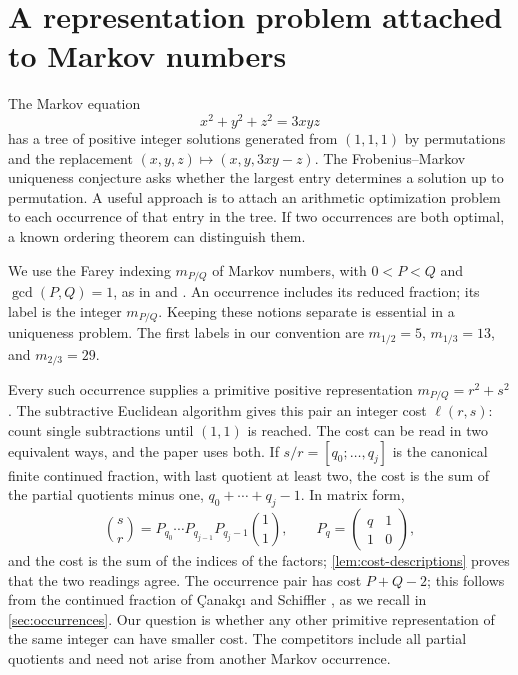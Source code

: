 \section{A representation problem attached to Markov numbers}

The Markov equation
$$
 x^2+y^2+z^2=3xyz
$$
has a tree of positive integer solutions generated from $(1,1,1)$ by permutations and
the replacement $(x,y,z)\mapsto(x,y,3xy-z)$. The Frobenius--Markov uniqueness
conjecture asks whether the largest entry determines a solution up to
permutation. A useful approach is to attach an arithmetic optimization
problem to each occurrence of that entry in the tree. If two occurrences
are both optimal, a known ordering theorem can distinguish them.

We use the Farey indexing $m_{P/Q}$ of Markov numbers, with
$0<P<Q$ and $\gcd(P,Q)=1$, as in \cite{Aigner2013} and
\cite{LagisquetEtAl2021}. An occurrence includes its reduced fraction;
its label is the integer $m_{P/Q}$. Keeping these notions separate is
essential in a uniqueness problem. The first labels in our convention
are $m_{1/2}=5$, $m_{1/3}=13$, and $m_{2/3}=29$.

Every such occurrence supplies a primitive positive representation
$m_{P/Q}=r^2+s^2$. The subtractive Euclidean algorithm gives this pair
an integer cost $\ell(r,s)$: count single subtractions until $(1,1)$ is
reached. The cost can be read in two equivalent ways, and the paper uses
both. If $s/r=[q_0;\ldots,q_j]$ is the canonical finite continued
fraction, with last quotient at least two, the cost is the sum of the
partial quotients minus one, $q_0+\cdots+q_j-1$. In matrix form,
$$
 \binom sr=P_{q_0}\cdots P_{q_{j-1}}P_{q_j-1}\binom11,\qquad
 P_q=\begin{pmatrix}q&1\\1&0\end{pmatrix},
$$
and the cost is the sum of the indices of the factors;
\cref{lem:cost-descriptions} proves that the two readings agree. The
occurrence pair has cost $P+Q-2$; this follows
from the continued fraction of \c{C}anak\c{c}{\i} and Schiffler
\cite{CanakciSchiffler2020}, as we recall in \cref{sec:occurrences}.
Our question is whether any other primitive representation of the same
integer can have smaller cost. The competitors include all partial
quotients and need not arise from another Markov occurrence.

